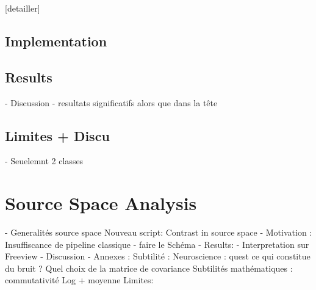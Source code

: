 [detailler]

\subsection{Implementation}



\subsection{Results}
- Discussion
- resultats significatifs alors que dans la tête


\subsection{Limites + Discu}

- Seuelemnt 2 classes

\section{Source Space Analysis}

- Generalités source space
Nouveau script: Contrast in source space
- Motivation : Insuffiscance de pipeline classique
- faire le Schéma
- Results:
- Interpretation sur Freeview
- Discussion
- Annexes : Subtilité :
Neuroscience : quest ce qui constitue du bruit ? Quel choix de la matrice de covariance
Subtilités mathématiques :  commutativité Log + moyenne
Limites:
